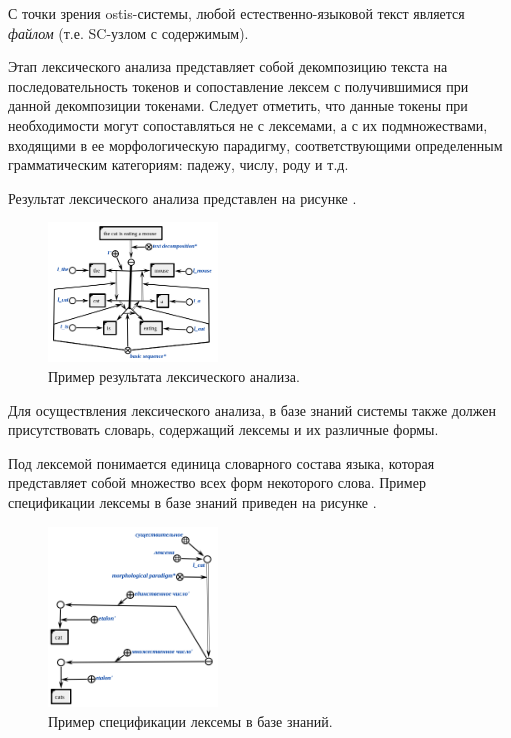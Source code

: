 С точки зрения ostis-системы, любой естественно-языковой текст является \textit{файлом} (т.е. SC-узлом с содержимым).

Этап лексического анализа представляет собой декомпозицию текста на последовательность токенов и сопоставление лексем с получившимися при данной декомпозиции токенами. Следует отметить, что данные токены при необходимости могут сопоставляться не с лексемами, а с их подмножествами, входящими в ее морфологическую парадигму, соответствующими определенным грамматическим категориям: падежу, числу, роду и т.д.

Результат лексического анализа представлен на рисунке \textit{}.

\begin{figure}[h]
    \centering
    \includegraphics[width=0.4\textwidth]{images/part4/chapter_nl_interfaces/lexical.png}
    \caption{Пример результата лексического анализа.}
    \label{fig:lexical_result}
\end{figure}

Для осуществления лексического анализа, в базе знаний системы также должен присутствовать словарь, содержащий лексемы и их различные формы.

Под лексемой понимается единица словарного состава языка, которая представляет собой множество всех форм некоторого слова.
Пример спецификации лексемы в базе знаний приведен на рисунке \textit{}.

\begin{figure}[h]
    \centering
    \includegraphics[width=0.4\textwidth]{images/part4/chapter_nl_interfaces/lexeme_example.png}
    \caption{Пример спецификации лексемы в базе знаний.}
    \label{fig:lexeme_example}
\end{figure}

